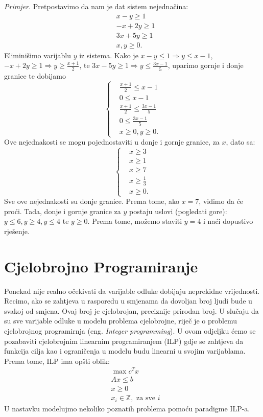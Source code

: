 \documentclass[a4paper, utf8, 11pt, colorlinks]{article}
\begin{document}
\emph{Primjer.} Pretpostavimo da nam je dat sistem nejednačina:
\begin{align*}
	 &x - y \geq 1 \\
	 &-x + 2y \geq 1 \\
	 & 3x + 5y \geq 1 \\
	 & x,y \geq 0.
\end{align*}
Eliminišimo varijablu $y$ iz sistema. Kako je $x-y \leq 1 \Rightarrow y \leq x -1 $, 
$-x + 2y \geq 1 \Rightarrow y \geq \frac{x+1}{2}$, te $ 3x - 5y \geq 1 \Rightarrow y \leq \frac{3x-1}{5}$, uparimo gornje i donje granice te dobijamo 
 $$
 \begin{cases}
 	&\frac{x+1}{2} \leq x-1 \\
 	& 0 \leq x-1 \\
 	& \frac{x+1}{2} \leq \frac{3x-1}{5} \\
 	& 0 \leq \frac{3x-1}{5} \\
 	& x \geq 0, y \geq 0.  	
 \end{cases}
 $$
Ove nejednakosti se mogu pojednostaviti u donje i gornje granice, 
za $x$, dato sa:
$$
\begin{cases}
    &x \geq 3 \\
    & x \geq 1 \\
    & x \geq 7 \\
    & x \geq \frac{1}{3} \\
    & x \geq 0.	
\end{cases}
$$
Sve ove nejednakosti su donje granice. Prema tome, ako $x=7$, vidimo da će proći. 
Tada, donje i gornje granice za $y$ postaju uslovi (pogledati gore): $y \leq 6, y \geq 4, y \leq 4$ te $y \geq 0$. Prema tome, možemo staviti $y=4$ i naći dopustivo rješenje. 

\newpage
\section{Cjelobrojno Programiranje}

Ponekad nije realno očekivati da varijable odluke dobijaju neprekidne vrijednosti. Recimo, ako se zahtjeva u rasporedu u smjenama da dovoljan broj ljudi bude u svakoj od smjena. Ovaj broj je cjelobrojan, preciznije prirodan broj. U slučaju da su sve varijable odluke u modelu problema cjelobrojne, riječ je o problemu cjelobrojnog programirnja (eng. \emph{Integer programming}). 
U ovom odjeljku ćemo se pozabaviti   cjelobrojnim linearnim programiranjem (ILP) gdje se zahtjeva da funkcija cilja kao i ograničenja u modelu budu linearni u svojim varijablama. Prema tome, ILP ima opšti oblik:
\begin{align}
    & \max c^T x \nonumber\\
    & A x \leq b \nonumber \\
    & x \geq 0 \nonumber\\
    & x_i \in \mathbb{Z}, \mbox{ za sve } i \label{ilp-formulation}
\end{align}
U nastavku modelujmo nekoliko poznatih problema pomoću paradigme ILP-a. 
\end{document}
